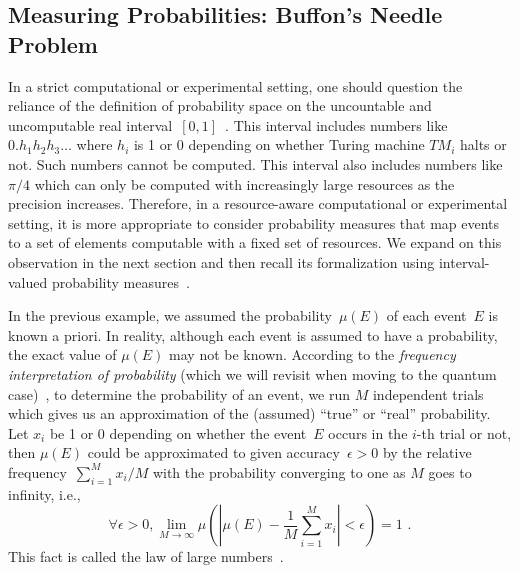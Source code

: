 \documentclass[12pt]{iopart}
\theoremstyle{plain}
\theoremstyle{definition}
\theoremstyle{remark}
\newcommand{\pmeas}{\ensuremath{\mu}}
\begin{document}
\subsection{Measuring Probabilities: Buffon's Needle Problem\label{subsec:Measuring-Probabilities:-Buffon}}

In a strict computational or experimental setting, one should question
the reliance of the definition of probability space on the uncountable
and uncomputable real
interval~$[0,1]$~\cite{Turing_1937,Ziegler2007,weihrauch2012computable}.
This interval includes numbers like $0.h_{1}h_{2}h_{3}\ldots$ where
$h_{i}$ is 1 or 0 depending on whether Turing machine
$\mathit{TM}_{i}$ halts or not. Such numbers cannot be computed. This
interval also includes numbers like $\pi / 4$ which can only be
computed with increasingly large resources as the precision
increases. Therefore, in a resource-aware computational or
experimental setting, it is more appropriate to consider probability
measures that map events to a set of elements computable with a fixed
set of resources. We expand on this observation in the next section
and then recall its formalization using interval-valued probability
measures~\cite{Weichselberger2000,JamisonLodwick2004}.
 
In the previous example, we assumed the probability~$\pmeas(E)$ of
each event~$E$ is known a priori. In reality, although each event is
assumed to have a probability, the exact value of $\pmeas(E)$ may not
be known. According to the \emph{frequency interpretation of
  probability} (which we will revisit when moving to the quantum
case)~\cite{Venn1876,Hajek2012}, 
to determine the probability of an event, we run $M$
independent trials which gives us an approximation of the (assumed)
``true'' or ``real'' probability. Let $x_{i}$ be 1 or 0 depending on
whether the event~$E$ occurs in the $i$-th trial or not, then
$\pmeas(E)$ could be approximated to given accuracy~$\epsilon>0$ by
the relative frequency~$\sum_{i=1}^{M}x_{i} / M$ with the
probability converging to one as $M$ goes to infinity, i.e.,
\begin{equation}
\forall\epsilon>0,\lim_{M\rightarrow\infty}\pmeas\left(\left|\pmeas(E)-\frac{1}{M}\sum_{i=1}^{M} x_{i}\right|<\epsilon\right)=1\textrm{ .}
\end{equation}
This fact is called the law of large numbers~\cite{Bernoulli2006,Kolmogorov1950,Uspensky1937,Shafer1976,544199}.
\end{document}
